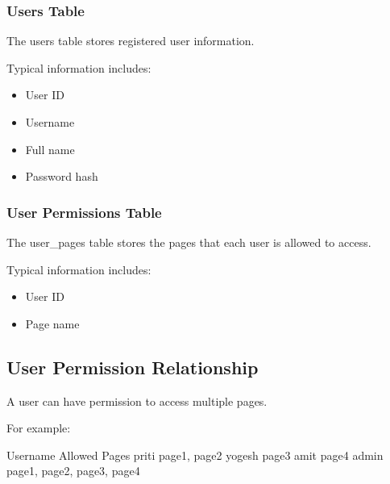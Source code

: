 \documentclass[letterpaper,10pt,english]{sphinxmanual}
\begin{document}
\subsubsection{Users Table}
\label{\detokenize{database:users-table}}
\sphinxAtStartPar
The users table stores registered user information.

\sphinxAtStartPar
Typical information includes:
\begin{itemize}
\item {} 
\sphinxAtStartPar
User ID

\item {} 
\sphinxAtStartPar
Username

\item {} 
\sphinxAtStartPar
Full name

\item {} 
\sphinxAtStartPar
Password hash

\end{itemize}


\subsubsection{User Permissions Table}
\label{\detokenize{database:user-permissions-table}}
\sphinxAtStartPar
The user\_pages table stores the pages that each user is allowed to access.

\sphinxAtStartPar
Typical information includes:
\begin{itemize}
\item {} 
\sphinxAtStartPar
User ID

\item {} 
\sphinxAtStartPar
Page name

\end{itemize}


\subsection{User Permission Relationship}
\label{\detokenize{database:user-permission-relationship}}
\sphinxAtStartPar
A user can have permission to access multiple pages.

\sphinxAtStartPar
For example:

\begin{sphinxVerbatim}[commandchars=\\\{\}]
Username    Allowed Pages
\PYGZhy{}\PYGZhy{}\PYGZhy{}\PYGZhy{}\PYGZhy{}\PYGZhy{}\PYGZhy{}\PYGZhy{}    \PYGZhy{}\PYGZhy{}\PYGZhy{}\PYGZhy{}\PYGZhy{}\PYGZhy{}\PYGZhy{}\PYGZhy{}\PYGZhy{}\PYGZhy{}\PYGZhy{}\PYGZhy{}\PYGZhy{}\PYGZhy{}\PYGZhy{}\PYGZhy{}\PYGZhy{}\PYGZhy{}\PYGZhy{}\PYGZhy{}
priti       page1, page2
yogesh      page3
amit        page4
admin       page1, page2, page3, page4
\end{sphinxVerbatim}
\end{document}
